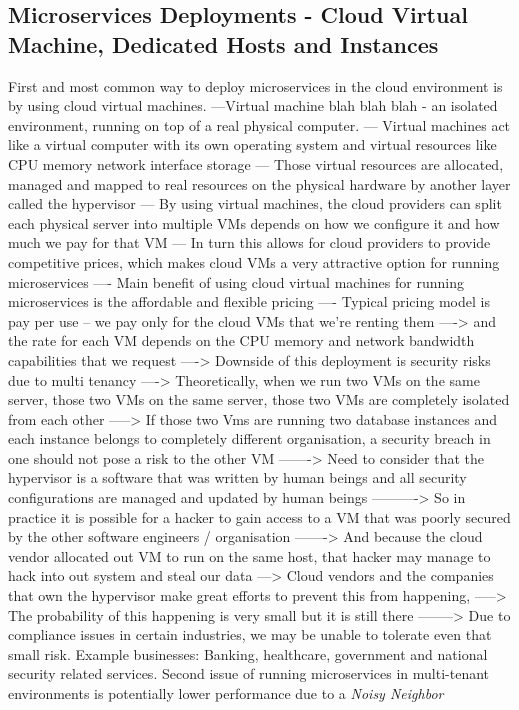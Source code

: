 \documentclass[a4paper, 11pt]{book}
\begin{document}
    \subsection{Microservices Deployments - Cloud Virtual Machine, Dedicated Hosts and Instances}
    First and most common way to deploy microservices in the cloud environment is by using cloud virtual machines.
    ---Virtual machine blah blah blah - an isolated environment, running on top of a real physical computer.
    --- Virtual machines act like a virtual computer with its own operating system and virtual resources like CPU memory network interface storage
    --- Those virtual resources are allocated, managed and mapped to real resources on the physical hardware by another layer called the hypervisor
    --- By using virtual machines, the cloud providers can split each physical server into multiple VMs depends on how we configure it and how much we pay for that VM
    --- In turn this allows for cloud providers to provide competitive prices, which makes cloud VMs a very attractive option for running microservices
    ---- Main benefit of using cloud virtual machines for running microservices is the affordable and flexible pricing
    ---- Typical pricing model is pay per use -- we pay only for the cloud VMs that we're renting them
    ----> and the rate for each VM depends on the CPU memory and network bandwidth capabilities that we request
    ----> Downside of this deployment is security risks due to multi tenancy
    ----> Theoretically, when we run two VMs on the same server, those two VMs on the same server, those two VMs are completely isolated from each other
    -----> If those two Vms are running two database instances and each instance belongs to completely different organisation, a security breach in one should not pose a risk to the other VM
    -------> Need to consider that the hypervisor is a software that was written by human beings and all security configurations are managed and updated by human beings
    ----------> So in practice it is possible for a hacker to gain access to a VM that was poorly secured by the other software engineers / organisation
    -------> And because the cloud vendor allocated out VM to run on the same host, that hacker may manage to hack into out system and steal our data
    ---> Cloud vendors and the companies that own the hypervisor make great efforts to prevent this from happening,
    -----> The probability of this happening is very small but it is still there
    --------> Due to compliance issues in certain industries, we may be unable to tolerate even that small risk.
    Example businesses: Banking, healthcare, government and national security related services.
    Second issue of running microservices in multi-tenant environments is potentially lower performance due to a \textit{Noisy Neighbor}
\end{document}
